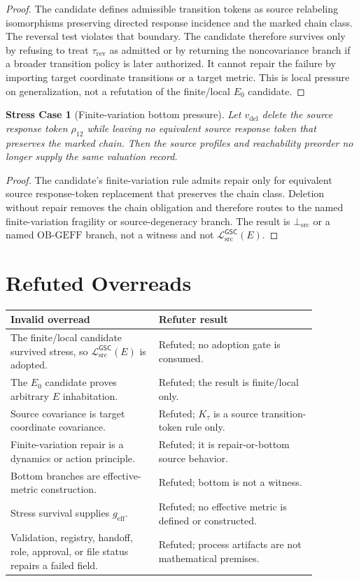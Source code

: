 \documentclass[11pt]{article}
\newcommand{\MetricData}{\mathcal{L}_{\mathrm{src}}^{\mathsf{GSC}}}
\newcommand{\BottomSrc}{\bot_{\mathrm{src}}}
\newcommand{\OBGEFF}{\mathrm{OB\mbox{-}GEFF}}
\newcommand{\geff}{g_{\mathrm{eff}}}
\newtheorem{stresscase}{Stress Case}
\begin{document}
\begin{proof}
The candidate defines admissible transition tokens as source relabeling
isomorphisms preserving directed response incidence and the marked chain
class. The reversal test violates that boundary. The candidate therefore
survives only by refusing to treat \(\tau_{\mathrm{rev}}\) as admitted or by
returning the noncovariance branch if a broader transition policy is later
authorized. It cannot repair the failure by importing target coordinate
transitions or a target metric. This is local pressure on generalization, not
a refutation of the finite/local \(E_0\) candidate.
\end{proof}

\begin{stresscase}[Finite-variation bottom pressure]
Let \(v_{\mathrm{del}}\) delete the source response token \(\rho_{12}\) while
leaving no equivalent source response token that preserves the marked chain.
Then the source profiles and reachability preorder no longer supply the same
valuation record.
\end{stresscase}

\begin{proof}
The candidate's finite-variation rule admits repair only for equivalent
source response-token replacement that preserves the chain class. Deletion
without repair removes the chain obligation and therefore routes to the named
finite-variation fragility or source-degeneracy branch. The result is
\(\BottomSrc\) or a named \(\OBGEFF\) branch, not a witness and not
\(\MetricData(E)\).
\end{proof}

\section{Refuted Overreads}

\begin{center}
\begin{tabular}{p{0.42\linewidth}p{0.45\linewidth}}
\toprule
Invalid overread & Refuter result \\
\midrule
The finite/local candidate survived stress, so \(\MetricData(E)\) is adopted. & Refuted; no adoption gate is consumed. \\
The \(E_0\) candidate proves arbitrary \(E\) inhabitation. & Refuted; the result is finite/local only. \\
Source covariance is target coordinate covariance. & Refuted; \(K_{\tau}\) is a source transition-token rule only. \\
Finite-variation repair is a dynamics or action principle. & Refuted; it is repair-or-bottom source behavior. \\
Bottom branches are effective-metric construction. & Refuted; bottom is not a witness. \\
Stress survival supplies \(\geff\). & Refuted; no effective metric is defined or constructed. \\
Validation, registry, handoff, role, approval, or file status repairs a failed field. & Refuted; process artifacts are not mathematical premises. \\
\bottomrule
\end{tabular}
\end{center}
\end{document}
